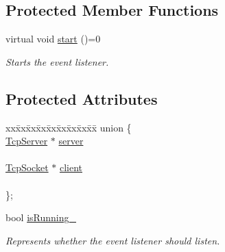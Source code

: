 \subsection*{Protected Member Functions}
\begin{DoxyCompactItemize}
\item 
\mbox{\label{class_tcp_event_listener_a900e4938c19ae2371c4621e5c9d46730}} 
virtual void \mbox{\hyperlink{class_tcp_event_listener_a900e4938c19ae2371c4621e5c9d46730}{start}} ()=0
\begin{DoxyCompactList}\small\item\em Starts the event listener. \end{DoxyCompactList}\end{DoxyCompactItemize}
\subsection*{Protected Attributes}
\begin{DoxyCompactItemize}
\item 
\mbox{\label{class_tcp_event_listener_a2d916c707cc58771608ffdc8ae9dfa13}} 
\begin{tabbing}
xx\=xx\=xx\=xx\=xx\=xx\=xx\=xx\=xx\=\kill
union \{\\
\>\mbox{\hyperlink{class_tcp_server}{TcpServer}} $\ast$ \mbox{\hyperlink{class_tcp_event_listener_aa0a66ee360e15e349eda1c10041c3219}{server}}\\
\>\\
\>\mbox{\hyperlink{class_tcp_socket}{TcpSocket}} $\ast$ \mbox{\hyperlink{class_tcp_event_listener_a0a05150db3b589bb5fe136b18e5418f3}{client}}\\
\>\\
\}; \\

\end{tabbing}\item 
\mbox{\label{class_tcp_event_listener_a3b623004e10074b2375a3bb7bc9c6c28}} 
bool \mbox{\hyperlink{class_tcp_event_listener_a3b623004e10074b2375a3bb7bc9c6c28}{is\+Running\+\_\+}}
\begin{DoxyCompactList}\small\item\em Represents whether the event listener should listen. \end{DoxyCompactList}\end{DoxyCompactItemize}


